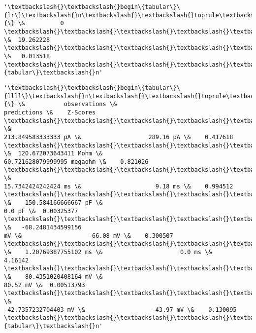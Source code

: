             \begin{tcolorbox}[breakable, size=fbox, boxrule=.5pt, pad at break*=1mm, opacityfill=0]
\begin{Verbatim}[commandchars=\\\{\}]
'\textbackslash{}\textbackslash{}begin\{tabular\}\{lr\}\textbackslash{}n\textbackslash{}\textbackslash{}toprule\textbackslash{}n\{\} \&          0 \textbackslash{}\textbackslash{}\textbackslash{}\textbackslash{}\textbackslash{}n\textbackslash{}\textbackslash{}midrule\textbackslash{}nchi\textbackslash{}\textbackslash{}\_square
\&  19.262228 \textbackslash{}\textbackslash{}\textbackslash{}\textbackslash{}\textbackslash{}np\textbackslash{}\textbackslash{}\_value    \&   0.013518
\textbackslash{}\textbackslash{}\textbackslash{}\textbackslash{}\textbackslash{}n\textbackslash{}\textbackslash{}bottomrule\textbackslash{}n\textbackslash{}\textbackslash{}end\{tabular\}\textbackslash{}n'
\end{Verbatim}
\end{tcolorbox}
        
            \begin{tcolorbox}[breakable, size=fbox, boxrule=.5pt, pad at break*=1mm, opacityfill=0]
\begin{Verbatim}[commandchars=\\\{\}]
'\textbackslash{}\textbackslash{}begin\{tabular\}\{llll\}\textbackslash{}n\textbackslash{}\textbackslash{}toprule\textbackslash{}n\{\} \&           observations \&
predictions \&    Z-Scores \textbackslash{}\textbackslash{}\textbackslash{}\textbackslash{}\textbackslash{}n\textbackslash{}\textbackslash{}midrule\textbackslash{}nRheobaseTest                   \&
213.849583333333 pA \&                   289.16 pA \&    0.417618
\textbackslash{}\textbackslash{}\textbackslash{}\textbackslash{}\textbackslash{}nInputResistanceTest            \&  120.672073643411 Mohm \&
60.721628079999995 megaohm \&    0.821026 \textbackslash{}\textbackslash{}\textbackslash{}\textbackslash{}\textbackslash{}nTimeConstantTest               \&
15.7342424242424 ms \&                     9.18 ms \&    0.994512
\textbackslash{}\textbackslash{}\textbackslash{}\textbackslash{}\textbackslash{}nCapacitanceTest                \&    150.584166666667 pF \&
0.0 pF \&  0.00325377 \textbackslash{}\textbackslash{}\textbackslash{}\textbackslash{}\textbackslash{}nRestingPotentialTest           \&   -68.2481434599156
mV \&                   -66.08 mV \&    0.300507 \textbackslash{}\textbackslash{}\textbackslash{}\textbackslash{}\textbackslash{}nInjectedCurrentAPWidthTest
\&    1.20769387755102 ms \&                      0.0 ms \&     4.16142
\textbackslash{}\textbackslash{}\textbackslash{}\textbackslash{}\textbackslash{}nInjectedCurrentAPAmplitudeTest \&    80.4351020408164 mV \&
80.52 mV \&  0.00513793 \textbackslash{}\textbackslash{}\textbackslash{}\textbackslash{}\textbackslash{}nInjectedCurrentAPThresholdTest \&
-42.7357232704403 mV \&                   -43.97 mV \&    0.130095
\textbackslash{}\textbackslash{}\textbackslash{}\textbackslash{}\textbackslash{}n\textbackslash{}\textbackslash{}bottomrule\textbackslash{}n\textbackslash{}\textbackslash{}end\{tabular\}\textbackslash{}n'
\end{Verbatim}
\end{tcolorbox}
        
